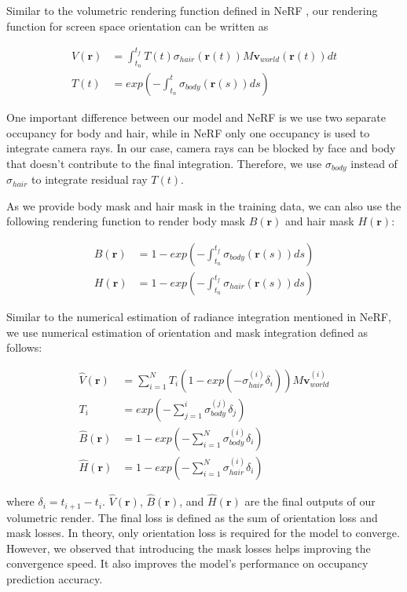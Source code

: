 \documentclass{article}
\begin{document}
Similar to the volumetric rendering function defined in NeRF \cite{mildenhall_nerf_2020}, our rendering function for screen space orientation can be written as

\begin{align}
	V(\mathbf{r}) & = \int_{t_{n}}^{t_{f}} T(t) \sigma_{hair}(\mathbf{r}(t)) M \mathbf{v}_{world}(\mathbf{r}(t)) dt \\
	T(t) & = exp(-\int_{t_{n}}^{t} \sigma_{body}(\mathbf{r}(s)) ds)
\end{align}

One important difference between our model and NeRF is we use two separate occupancy for body and hair, while in NeRF only one occupancy is used to integrate camera rays. In our case, camera rays can be blocked by face and body that doesn't contribute to the final integration. Therefore, we use $\sigma_{body}$ instead of $\sigma_{hair}$ to integrate residual ray $T(t)$.

As we provide body mask and hair mask in the training data, we can also use the following rendering function to render body mask $B(\mathbf{r})$ and hair mask $H(\mathbf{r})$:

\begin{align}
	B(\mathbf{r}) & = 1 - exp(-\int_{t_{n}}^{t_{f}} \sigma_{body}(\mathbf{r}(s)) ds) \\
	H(\mathbf{r}) & = 1 - exp(-\int_{t_{n}}^{t_{f}} \sigma_{hair}(\mathbf{r}(s)) ds)
\end{align}

Similar to the numerical estimation of radiance integration mentioned in NeRF, we use numerical estimation of orientation and mask integration defined as follows:

\begin{align}
	\hat{V}(\mathbf{r}) & = \sum_{i=1}^{N} T_{i} (1 - exp(-\sigma_{hair}^{(i)} \delta_{i})) M \mathbf{v}_{world}^{(i)} \\
	T_{i} & = exp(-\sum_{j=1}^{i} \sigma_{body}^{(j)} \delta_{j}) \\
	\hat{B}(\mathbf{r}) & = 1 - exp(-\sum_{i=1}^{N} \sigma_{body}^{(i)} \delta_{i}) \\
	\hat{H}(\mathbf{r}) & = 1 - exp(-\sum_{i=1}^{N} \sigma_{hair}^{(i)} \delta_{i})
\end{align}

where $\delta_{i} = t_{i + 1} - t_{i}$. $\hat{V}(\mathbf{r})$, $\hat{B}(\mathbf{r})$, and $\hat{H}(\mathbf{r})$ are the final outputs of our volumetric render. The final loss is defined as the sum of orientation loss and mask losses. In theory, only orientation loss is required for the model to converge. However, we observed that introducing the mask losses helps improving the convergence speed. It also improves the model's performance on occupancy prediction accuracy.
\end{document}

